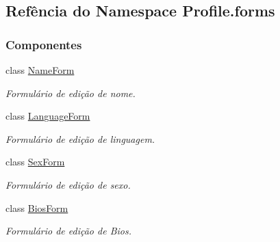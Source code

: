 \hypertarget{namespaceProfile_1_1forms}{\subsection{Refência do Namespace Profile.\-forms}
\label{namespaceProfile_1_1forms}
}
\subsubsection*{Componentes}
\begin{DoxyCompactItemize}
\item 
class \hyperlink{classProfile_1_1forms_1_1NameForm}{Name\-Form}
\begin{DoxyCompactList}\small\item\em Formulário de edição de nome. \end{DoxyCompactList}\item 
class \hyperlink{classProfile_1_1forms_1_1LanguageForm}{Language\-Form}
\begin{DoxyCompactList}\small\item\em Formulário de edição de linguagem. \end{DoxyCompactList}\item 
class \hyperlink{classProfile_1_1forms_1_1SexForm}{Sex\-Form}
\begin{DoxyCompactList}\small\item\em Formulário de edição de sexo. \end{DoxyCompactList}\item 
class \hyperlink{classProfile_1_1forms_1_1BiosForm}{Bios\-Form}
\begin{DoxyCompactList}\small\item\em Formulário de edição de Bios. \end{DoxyCompactList}\end{DoxyCompactItemize}

